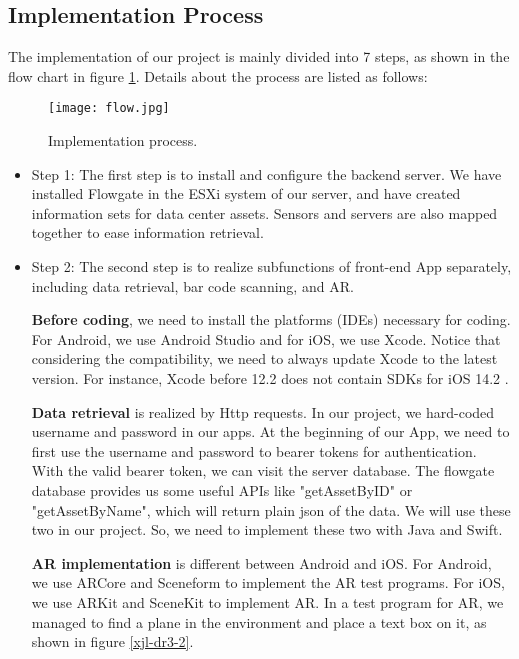 \documentclass[11pt,a4paper]{article}
\begin{document}
\begin{onehalfspace}
\begin{itemize}
    
\end{itemize}




\subsection{Implementation Process}
The implementation of our project is mainly divided into 7 steps, as shown in the flow chart in figure \ref{xjl-dr3-1}. Details about the process are listed as follows:



\begin{figure}[h]
	\centering
	\texttt{[image: flow.jpg]}
	\caption{Implementation process.}
	\label{xjl-dr3-1}
\end{figure}

\begin{itemize}
\item Step 1: The first step is to install and configure the backend server. We have installed Flowgate in the ESXi system of our server, and have created information sets for data center assets. Sensors and servers are also mapped together to ease information retrieval.

\item Step 2: The second step is to realize subfunctions of front-end App separately, including data retrieval, bar code scanning, and AR.

\textbf{Before coding}, we need to install the platforms (IDEs) necessary for coding. For Android, we use Android Studio and for iOS, we use Xcode. Notice that considering the compatibility, we need to always update Xcode to the latest version. For instance, Xcode before 12.2 does not contain SDKs for iOS 14.2 \cite{zsy1}.

\textbf{Data retrieval} is realized by Http requests. In our project, we hard-coded username and password in our apps. At the beginning of our App, we need to first use the username and password to bearer tokens for authentication. With the valid bearer token, we can visit the server database. The flowgate database provides us some useful APIs like "getAssetByID" or "getAssetByName", which will return plain json of the data. We will use these two in our project. So, we need to implement these two with Java and Swift. 

\textbf{AR implementation} is different between Android and iOS. For Android, we use ARCore and Sceneform to implement the AR test programs. For iOS, we use ARKit and SceneKit to implement AR. In a test program for AR, we managed to find a plane in the environment and place a text box on it, as shown in figure \ref{xjl-dr3-2}.


\end{itemize}
\end{onehalfspace}
\end{document}
